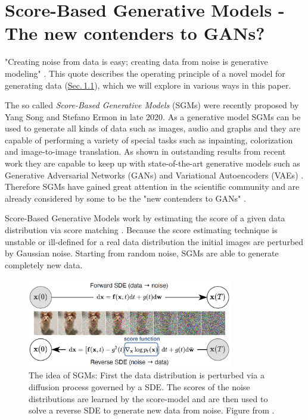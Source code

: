 \section{Score-Based Generative Models - The new contenders to GANs?} 
\thispagestyle{plain}
"Creating noise from data is easy; creating data from noise is generative modeling" \cite{score_3}. This quote describes the operating principle of a novel model for generating data (\hyperref[sec:1.1]{Sec.\,1.1}), which we will explore in various ways in this paper.

The so called \textit{Score-Based Generative Models} (SGMs) were recently proposed by Yang Song and Stefano Ermon \cite{score_1} in late 2020. As a generative model SGMs can be used to generate all kinds of data such as images, audio and graphs and they are capable of performing a variety of special tasks such as inpainting, colorization and image-to-image translation. As shown in outstanding results from recent work \cite{score_3} they are capable to keep up with state-of-the-art generative models such as Generative Adversarial Networks (GANs) \cite{gan_original} and Variational Autoencoders (VAEs) \cite{vae_original}. Therefore SGMs have gained great attention in the scientific community and are already considered by some to be the "new contenders to GANs" \cite{blog}.

\thispagestyle{plain}
Score-Based Generative Models work by estimating the score of a given data distribution via score matching \cite{score_matching_original}. Because the score estimating technique is unstable or ill-defined for a real data distribution the initial images are perturbed by Gaussian noise. Starting from random noise, SGMs are able to generate completely new data.

\thispagestyle{plain}
%
\begin{figure}[]
    \centering
    \includegraphics[width=0.8\textwidth]{Chapters/figures/sgm.PNG}
    \caption[The idea of Score-Based Generative Models]{The idea of SGMs: First the data distribution is perturbed via a diffusion process governed by a SDE. The scores of the noise distributions are learned by the score-model and are then used to solve a reverse SDE to generate new data from noise. Figure from \cite{score_3}.}
\end{figure}
%

